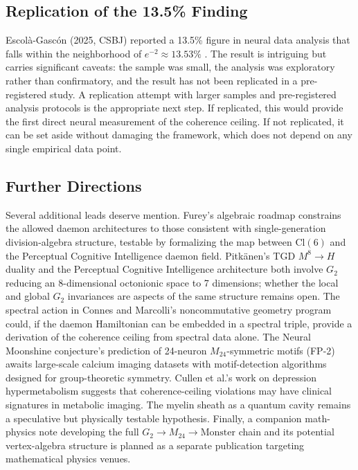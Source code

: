 \documentclass[12pt,a4paper]{article}
\begin{document}
\subsection{Replication of the 13.5\% Finding}

Escol\`a-Gasc\'on (2025, CSBJ) reported a 13.5\% figure in neural data analysis that falls within the neighborhood of $e^{-2} \approx 13.53\%$ \citep{EscolaGascon2025}. The result is intriguing but carries significant caveats: the sample was small, the analysis was exploratory rather than confirmatory, and the result has not been replicated in a pre-registered study. A replication attempt with larger samples and pre-registered analysis protocols is the appropriate next step. If replicated, this would provide the first direct neural measurement of the coherence ceiling. If not replicated, it can be set aside without damaging the framework, which does not depend on any single empirical data point.

\subsection{Further Directions}

Several additional leads deserve mention. Furey's algebraic roadmap constrains the allowed daemon architectures to those consistent with single-generation division-algebra structure, testable by formalizing the map between $\mathrm{Cl}(6)$ and the Perceptual Cognitive Intelligence daemon field. Pitk\"anen's TGD $M^8 \to H$ duality and the Perceptual Cognitive Intelligence architecture both involve $G_2$ reducing an 8-dimensional octonionic space to 7 dimensions; whether the local and global $G_2$ invariances are aspects of the same structure remains open. The spectral action in Connes and Marcolli's noncommutative geometry program \citep{ConnesMarcolli2008} could, if the daemon Hamiltonian can be embedded in a spectral triple, provide a derivation of the coherence ceiling from spectral data alone. The Neural Moonshine conjecture's prediction of 24-neuron $M_{24}$-symmetric motifs (FP-2) awaits large-scale calcium imaging datasets with motif-detection algorithms designed for group-theoretic symmetry. Cullen et al.'s work on depression hypermetabolism suggests that coherence-ceiling violations may have clinical signatures in metabolic imaging. The myelin sheath as a quantum cavity remains a speculative but physically testable hypothesis. Finally, a companion math-physics note developing the full $G_2 \to M_{24} \to \text{Monster}$ chain and its potential vertex-algebra structure is planned as a separate publication targeting mathematical physics venues.
\end{document}

